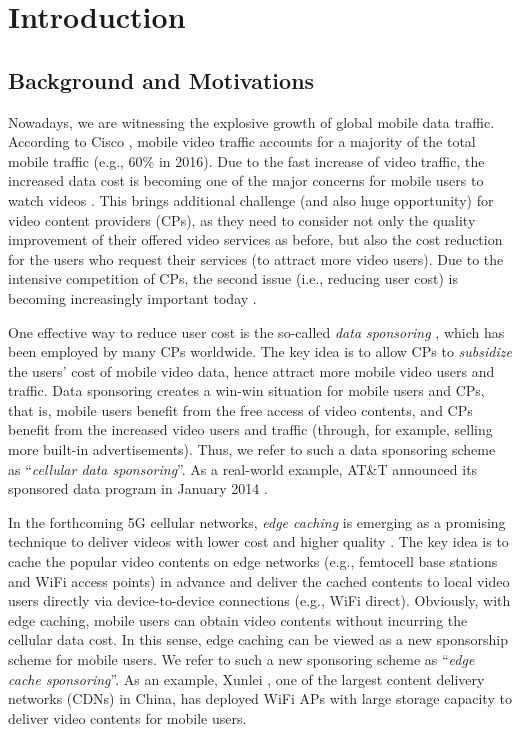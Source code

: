 \section{Introduction}
\label{sec:intro}

\subsection{Background and Motivations}

Nowadays, we are witnessing the explosive growth of global mobile data traffic.
According to Cisco \cite{cisco}, mobile video traffic accounts for a majority of the total mobile traffic (e.g., $60\%$ in 2016).
Due to the fast increase of video traffic, the increased data cost is becoming one of the major concerns for mobile users to watch videos \cite{add-1}.
This brings additional challenge (and also huge opportunity) for video content providers (CPs), as they need to consider not only the quality improvement of their offered video services as before, but also the cost reduction for the users who request their services (to attract more video users).
Due to the intensive competition of CPs, the second issue (i.e., reducing user cost) is becoming increasingly important today \cite{add-2,add-4}.

One effective way to reduce user cost is the so-called \emph{data sponsoring} \cite{sdp1,sdp2,sdp3}, which has been employed by many CPs worldwide.
The key idea is to allow CPs to \emph{subsidize} the users' cost of mobile video data, hence attract more mobile video users and traffic.
Data sponsoring creates a win-win situation for mobile users and CPs, that is,  mobile users benefit from the free access of video contents, and CPs benefit from the increased video users and traffic (through, for example, selling more built-in advertisements).
Thus, we refer to such a data sponsoring scheme as ``\emph{cellular data sponsoring}''.
As a real-world example, AT\&T announced its sponsored data program in January 2014 \cite{att}.

In the forthcoming 5G cellular networks, \emph{edge caching} is emerging as a promising technique to deliver videos with lower cost and higher quality \cite{sam,add-5}.
The key idea is to cache the popular video contents on edge networks (e.g., femtocell base stations and WiFi access points) in advance and deliver the cached contents to local video users directly via device-to-device connections (e.g., WiFi direct).
Obviously, with edge caching, mobile users can obtain video contents without incurring the cellular data cost.
In this sense, edge caching can be viewed as a new sponsorship scheme for mobile users.
We refer to such a new sponsoring scheme as ``\emph{edge cache sponsoring}''.
As an example, Xunlei \cite{thunder}, one of the largest content delivery networks (CDNs) in China, has deployed WiFi APs with large storage capacity to deliver video contents for mobile users.

